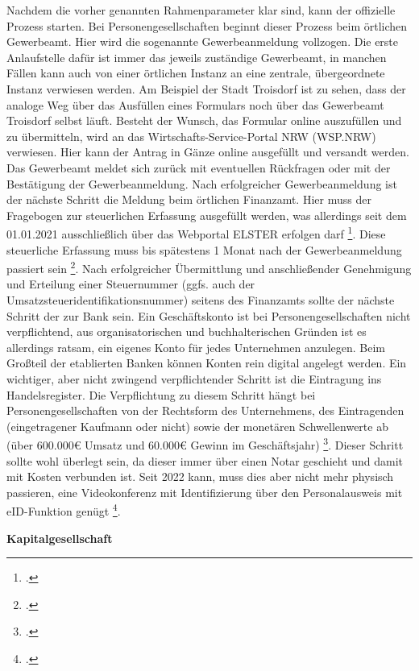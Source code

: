 Nachdem die vorher genannten Rahmenparameter klar sind, kann der offizielle Prozess starten. Bei Personengesellschaften beginnt dieser Prozess beim örtlichen Gewerbeamt. Hier wird die sogenannte Gewerbeanmeldung vollzogen. Die erste Anlaufstelle dafür ist immer das jeweils zuständige Gewerbeamt, in manchen Fällen kann auch von einer örtlichen Instanz an eine zentrale, übergeordnete Instanz verwiesen werden. Am Beispiel der Stadt Troisdorf ist zu sehen, dass der analoge Weg über das Ausfüllen eines Formulars noch über das Gewerbeamt Troisdorf selbst läuft. Besteht der Wunsch, das Formular online auszufüllen und zu übermitteln, wird an das Wirtschafts-Service-Portal NRW (WSP.NRW) verwiesen. Hier kann der Antrag in Gänze online ausgefüllt und versandt werden. Das Gewerbeamt meldet sich zurück mit eventuellen Rückfragen oder mit der Bestätigung der Gewerbeanmeldung. Nach erfolgreicher Gewerbeanmeldung ist der nächste Schritt die Meldung beim örtlichen Finanzamt. Hier muss der Fragebogen zur steuerlichen Erfassung ausgefüllt werden, was allerdings seit dem 01.01.2021 ausschließlich über das Webportal ELSTER erfolgen darf \footcite{oa_formular-management-system_nodate}. Diese steuerliche Erfassung muss bis spätestens 1 Monat nach der Gewerbeanmeldung passiert sein \footcite{oa_fragebogen_nodate}. Nach erfolgreicher Übermittlung und anschließender Genehmigung und Erteilung einer Steuernummer (ggfs. auch der Umsatzsteueridentifikationsnummer) seitens des Finanzamts sollte der nächste Schritt der zur Bank sein. Ein Geschäftskonto ist bei Personengesellschaften nicht verpflichtend, aus organisatorischen und buchhalterischen Gründen ist es allerdings ratsam, ein eigenes Konto für jedes Unternehmen anzulegen. Beim Großteil der etablierten Banken können Konten rein digital angelegt werden. Ein wichtiger, aber nicht zwingend verpflichtender Schritt ist die Eintragung ins Handelsregister. Die Verpflichtung zu diesem Schritt hängt bei Personengesellschaften von der Rechtsform des Unternehmens, des Eintragenden (eingetragener Kaufmann oder nicht) sowie der monetären Schwellenwerte ab (über 600.000€ Umsatz und 60.000€ Gewinn im Geschäftsjahr) \footcite{oa_kaufmannseigenschaft_nodate}. Dieser Schritt sollte wohl überlegt sein, da dieser immer über einen Notar geschieht und damit mit Kosten verbunden ist. Seit 2022 kann, muss dies aber nicht mehr physisch passieren, eine Videokonferenz mit Identifizierung über den Personalausweis mit eID-Funktion genügt \footcite{oa_firma_nodate}. 

\textbf{Kapitalgesellschaft}

